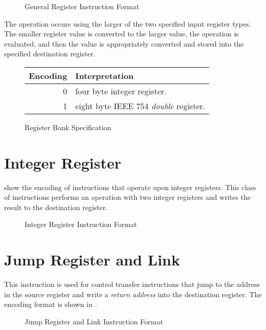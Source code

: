\begin{figure}[h!]
  \centering
    \usebox{\gregtypebox}
    \caption{General Register Instruction Format}
    \label{fig:general-register-format}
\end{figure}

The operation occurs using the larger of the two specified input
register types.  The smaller register value is converted to the larger
value, the operation is evaluated, and then the value is appropriately
converted and stored into the specified destination register.

\begin{figure}[h!]
  \centering
    \begin{tabular}{r|l}
      Encoding & Interpretation \\
      \hline 0 & four byte integer register. \\
      1 & eight byte IEEE 754 \emph{double} register. \\
    \end{tabular}
    \caption{Register Bank Specification}
    \label{fig:register-bank}
\end{figure}


\section{Integer Register}

 show the encoding of instructions
that operate upon integer registers. This class of instructions
performs an operation with two integer registers and writes the result
to the destination register.

\begin{figure}[h!]
  \centering
  \usebox{\rtypebox}
  \caption{Integer Register Instruction Format}
  \label{fig:integer-register-format}
\end{figure}


\section{Jump Register and Link}

This instruction is used for control transfer instructions that jump
to the address in the source register and write a \emph{return
  address} into the destination register.  The encoding format is
shown in .

\begin{figure}[h!]
  \centering
\jralbox\usebox{\jraltypebox}
    \caption{Jump Register and Link Instruction Format}
    \label{fig:jump-register-and-link-format}
\end{figure}


